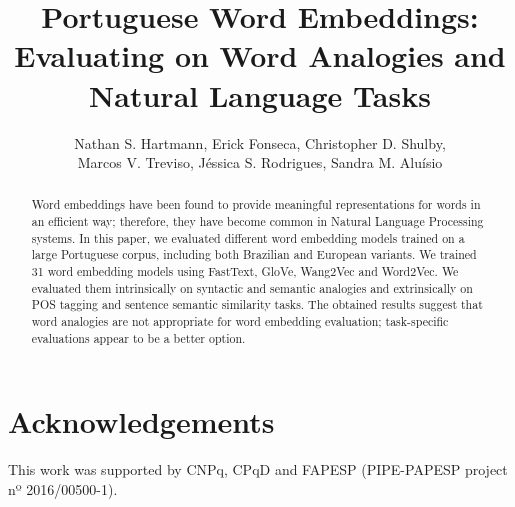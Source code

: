\documentclass[14pt]{article}
\title{Portuguese Word Embeddings: Evaluating on Word Analogies and Natural Language Tasks}
\author{Nathan S. Hartmann\inst{1}, Erick Fonseca\inst{1}, Christopher D. Shulby\inst{1},\\ Marcos V. Treviso\inst{1}, Jéssica S. Rodrigues\inst{2}, Sandra M. Aluísio\inst{1}}
\begin{document}
\maketitle

\begin{abstract}
Word embeddings have been found to provide meaningful representations for words in an efficient way; therefore, they have become common in Natural Language Processing systems. In this paper, we evaluated different word embedding models trained on a large Portuguese corpus, including both Brazilian and European variants. We trained 31 word embedding models using FastText, GloVe, Wang2Vec and Word2Vec. We evaluated them intrinsically on syntactic and semantic analogies and extrinsically on POS tagging and sentence semantic similarity tasks. The obtained results suggest that word analogies are not appropriate for word embedding evaluation; task-specific evaluations appear to be a better option.
\end{abstract}








\section*{Acknowledgements}

This work was supported by CNPq, CPqD and FAPESP (PIPE-PAPESP project nº 2016/00500-1).



\end{document}
